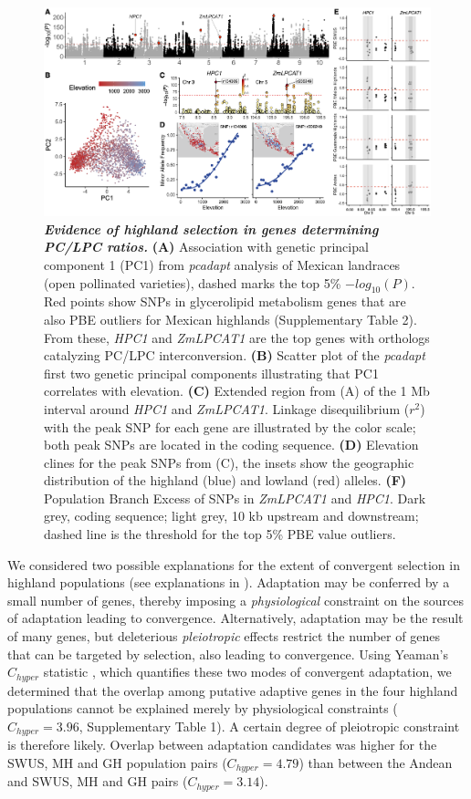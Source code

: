 \documentclass[9pt,twocolumn,twoside,lineno]{biorxiv}
\newcommand{\hpc}{\textit{HPC1}\xspace}
\begin{document}
\begin{figure}[ht]
\centering
\includegraphics[width=0.8\paperwidth]{Figures/Fig_2.png}
\caption{\textbf{\textit{Evidence of highland selection in genes determining PC/LPC ratios.}}
 \textbf{(A)} Association with genetic principal component 1 (PC1) from \textit{pcadapt} analysis of Mexican landraces (open pollinated varieties), dashed marks the top 5\% $-log_{10}(P)$. 
 Red points show SNPs in glycerolipid metabolism genes that are also PBE outliers for Mexican highlands (Supplementary Table 2). 
 From these, \hpc and \textit{ZmLPCAT1} are the top genes with orthologs catalyzing PC/LPC interconversion. 
 \textbf{(B)} Scatter plot of the \textit{pcadapt} first two genetic principal components illustrating that PC1 correlates with elevation.
 \textbf{(C)} Extended region from (A) of the 1 Mb interval around \hpc and \textit{ZmLPCAT1}. Linkage disequilibrium ($r^2$) with the peak SNP for each gene are illustrated by the color scale; both peak SNPs are located in the coding sequence. 
 \textbf{(D)} Elevation clines for the peak SNPs from (C), the insets show the geographic distribution of the highland (blue) and lowland (red) alleles.
\textbf{(F)} Population Branch Excess of SNPs in \textit{ZmLPCAT1} and \hpc. Dark grey, coding sequence; light grey, 10 kb upstream and downstream; dashed line is the threshold for the top 5\% PBE value outliers.} 
\label{Fig2}
\end{figure}

We considered two possible explanations for the extent of convergent selection in highland populations (see explanations in \cite{Wang2020-mp, yeaman2018}). 
Adaptation may be conferred by a small number of genes, thereby imposing a \textit{physiological} constraint on the sources of adaptation leading to convergence. 
Alternatively, adaptation may be the result of many genes, but deleterious \textit{pleiotropic} effects restrict the number of genes that can be targeted by selection, also leading to convergence.  
Using Yeaman's $C_{hyper}$ statistic \cite{yeaman2018}, which quantifies these two modes of convergent adaptation, we determined that the overlap among putative adaptive genes in the four highland populations cannot be explained merely by physiological constraints ($C_{hyper} = 3.96$, Supplementary Table 1). 
A certain degree of pleiotropic constraint is therefore likely.
Overlap between adaptation candidates was higher for the SWUS, MH and GH population pairs ($C_{hyper} = 4.79$) than between the Andean and SWUS, MH and GH pairs ($C_{hyper} = 3.14$).
\end{document}
